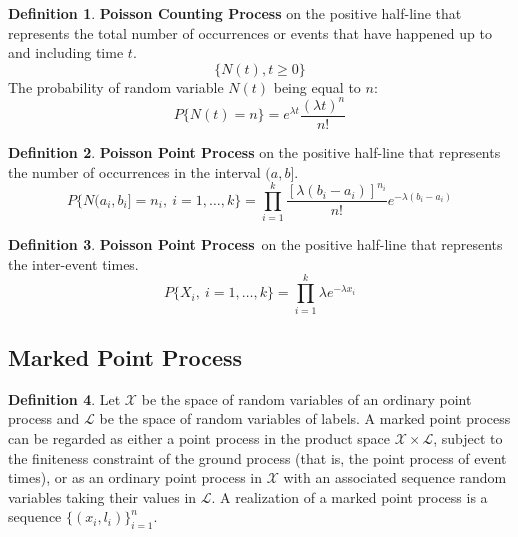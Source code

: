 \documentclass[12pt]{article}
\theoremstyle{plain}
\theoremstyle{definition}
\newtheorem{definition}{Definition}
\theoremstyle{remark}
\begin{document}
\begin{definition}
  \textbf{Poisson Counting Process} on the positive half-line that represents
  the total number of occurrences or events that have happened up to and
  including time $t$.
  \begin{equation*}
    \{ N(t), t \geq 0 \}
  \end{equation*}
  The probability of random variable $N(t)$ being equal to $n$:
  \begin{equation*}
    P\{N(t)=n\} = e^{\lambda t} \frac{(\lambda t)^n}{n!}
  \end{equation*}
\end{definition}

\begin{definition}
  \textbf{Poisson Point Process} on the positive half-line that represents
  the number of occurrences in the interval $(a,b]$.
  \begin{equation*}
    P\{N(a_i,b_i] = n_i,\ i=1,\dots,k\} =
    \prod_{i=1}^k\frac{[\lambda(b_i-a_i)]^{n_i}}{n!}e^{-\lambda(b_i-a_i)}
  \end{equation*}
\end{definition}

\begin{definition}
  \textbf{Poisson Point Process}\footnotemark\ on the positive half-line that
  represents the inter-event times.
  \begin{equation*}
    P\{X_i,\ i=1,\dots,k\} =
    \prod_{i=1}^k\lambda e^{-\lambda x_i}
  \end{equation*}
\end{definition}

\subsection{Marked Point Process}

\begin{definition}
  Let $\mathcal{X}$ be the space of random variables of an ordinary point
  process and $\mathcal{L}$ be the space of random variables of labels.
  A marked point process can be regarded as either a point process in the
  product space $\mathcal{X} \times \mathcal{L}$, subject to the finiteness
  constraint of the ground process (that is, the point process of event times),
  or as an ordinary point process in $\mathcal{X}$ with an associated sequence
  random variables taking their values in $\mathcal{L}$.
  A realization of a marked point process is a sequence $\{(x_i,l_i)\}_{i=1}^n$.
\end{definition}
\end{document}

